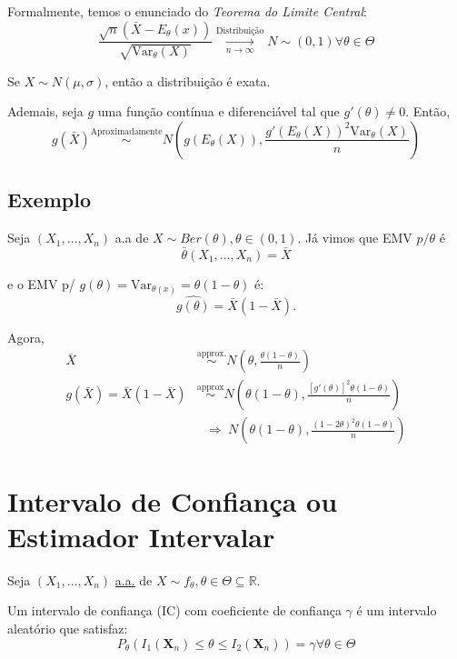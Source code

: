\documentclass[
  letterpaper,
  DIV=11,
  numbers=noendperiod]{scrreprt}
\begin{document}
Formalmente, temos o enunciado do \emph{Teorema do Limite Central}: \[
\frac{\sqrt{n}(\bar{X}-E_\theta(x))}{\sqrt{\mathrm{Var}_\theta(X)}} \underset{n\rightarrow \infty}{\stackrel{\text{Distribuição}}{\rightarrow}} N\sim (0,1) \forall \theta \in \Theta
\]

Se \(X\sim N(\mu, \sigma)\), então a distribuição é exata.

Ademais, seja \(g\) uma função contínua e diferenciável tal que
\(g'(\theta)\neq0\). Então, \[
g(\bar{X}) \stackrel{\text{Aproximadamente}}{\sim}N\left(g(E_\theta(X)), \frac{g'(E_\theta(X))^{2}\mathrm{Var}_\theta(X)}{n}\right)
\]

\section{Exemplo}\label{exemplo-4}

Seja \((X_{1},\dots,X_{n})\) a.a de
\(X\sim Ber(\theta), \theta \in (0,1)\). Já vimos que EMV \(p/ \theta\)
é \[
\bar{\theta}(X_{1},\dots,X_{n}) = \bar{X}
\]

e o EMV p/ \(g(\theta) = \mathrm{Var}_{\theta(x)}= \theta(1-\theta)\) é:
\[
\widehat{g(\theta)} = \bar{X}(1-\bar{X}).
\]

Agora, \[
\begin{aligned}
\bar{X} &\stackrel{\text{approx.}}{\sim} N\left(\theta, \frac{\theta(1-\theta)}{n}\right)\\
g(\bar{X}) = \bar{X}(1-\bar{X}) & \stackrel{\text{approx}}{\sim } N\left(\theta(1-\theta),
\frac{[g'(\theta)]^{2} \theta(1-\theta)}{n}\right) \\
&~~~\Rightarrow~N\left(\theta(1-\theta), \frac{(1-2\theta)^{2}\theta(1-\theta)}{n}\right)
\end{aligned}
\]


\chapter{Intervalo de Confiança ou Estimador
Intervalar}\label{intervalo-de-confianuxe7a-ou-estimador-intervalar}

Seja \((X_1,\ldots, X_n)\) \hyperref[sec-aa]{a.a.} de
\(X\sim f_\theta, \theta \in \Theta \subseteq \mathbb{R}\).

Um intervalo de confiança (IC) com coeficiente de confiança \(\gamma\) é
um intervalo aleatório que satisfaz: \[
P_{\theta} (I_{1}(\pmb{X}_{n}) \leq \theta \leq I_{2} (\pmb{X}_{n})) = \gamma \forall \theta \in \Theta
\]
\end{document}
